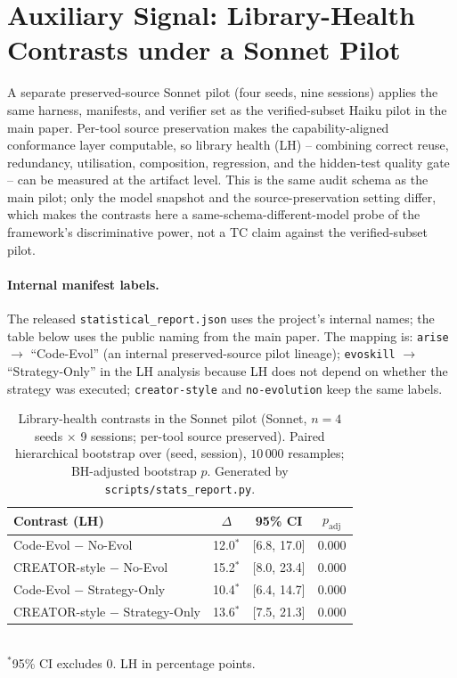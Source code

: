 \documentclass[sigconf,anonymous,review,natbib=false]{acmart}
\begin{document}
\section{Auxiliary Signal: Library-Health Contrasts under a Sonnet Pilot}
\label{app:lh-aux}

A separate preserved-source Sonnet pilot (four seeds, nine sessions)
applies the same harness, manifests, and verifier set as the
verified-subset Haiku pilot in the main paper. Per-tool source
preservation makes the capability-aligned conformance layer
computable, so library health (LH) -- combining correct reuse,
redundancy, utilisation, composition, regression, and the
hidden-test quality gate -- can be measured at the artifact level.
This is the same audit schema as the main pilot; only the model
snapshot and the source-preservation setting differ, which makes
the contrasts here a same-schema-different-model probe of the
framework's discriminative power, not a TC claim against the
verified-subset pilot.

\paragraph{Internal manifest labels.} The released \texttt{statistical\_report.json}
uses the project's internal names; the table below uses the public
naming from the main paper. The mapping is: \texttt{arise} $\rightarrow$
``Code-Evol'' (an internal preserved-source pilot lineage);
\texttt{evoskill} $\rightarrow$ ``Strategy-Only'' in the LH analysis
because LH does not depend on whether the strategy was executed;
\texttt{creator-style} and \texttt{no-evolution} keep the same labels.

\begin{table}[h]
\centering\small
\caption{Library-health contrasts in the Sonnet pilot
(Sonnet, $n{=}4$ seeds $\times$ 9 sessions; per-tool source preserved).
Paired hierarchical bootstrap over (seed, session), $10\,000$ resamples;
BH-adjusted bootstrap $p$. Generated by \texttt{scripts/stats\_report.py}.}
\label{tab:lh_stats_supp}
\begin{tabular}{lccc}
\toprule
\textbf{Contrast (LH)} & \textbf{$\Delta$} & \textbf{95\% CI} & \textbf{$p_{\mathrm{adj}}$} \\
\midrule
Code-Evol $-$ No-Evol           & 12.0$^{*}$ & [6.8, 17.0]  & 0.000 \\
CREATOR-style $-$ No-Evol       & 15.2$^{*}$ & [8.0, 23.4]  & 0.000 \\
Code-Evol $-$ Strategy-Only     & 10.4$^{*}$ & [6.4, 14.7]  & 0.000 \\
CREATOR-style $-$ Strategy-Only & 13.6$^{*}$ & [7.5, 21.3]  & 0.000 \\
\bottomrule
\end{tabular}
\\[2pt]\footnotesize $^{*}$95\% CI excludes 0. LH in percentage points.
\end{table}
\end{document}
